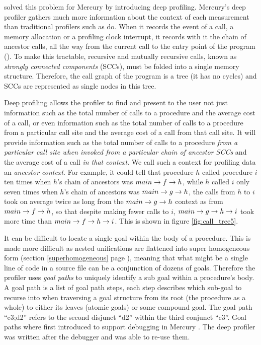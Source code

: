 \citep{conway:2001:mercury-deep}
solved this problem for Mercury by introducing deep profiling.
Mercury's deep profiler gathers much more information about the context of
each measurement than traditional profilers such as  \citep{gprof} do.
When it records the event of a call,
a memory allocation or a profiling clock interrupt,
it records with it the chain of ancestor calls,
all the way from the current call to the entry point of the program
().
To make this tractable,
recursive and mutually recursive calls,
known as \emph{strongly connected components} (SCCs),
must be folded into a single memory structure.
Therefore, the call graph of the program is a tree (it has no cycles)
and SCCs are represented as single nodes in this tree.

Deep profiling allows the profiler to find and present to the user
not just information such as the total number of calls to a procedure
and the average cost of a call,
or even information such as the total number of calls to a procedure
from a particular call site and the average cost of a call from that call
site.
It will provide information such as the total number of calls to a procedure
\emph{from a particular call site
when invoked from a particular chain of ancestor SCCs}
and the average cost of a call \emph{in that context}.
We call such a context for profiling data an \emph{ancestor context}.
For example, it could tell that
procedure $h$ called procedure $i$ ten times
when $h$'s chain of ancestors was $main \rightarrow f \rightarrow h$,
while $h$ called $i$ only seven times
when $h$'s chain of ancestors was $main \rightarrow g \rightarrow h$,
the calls from $h$ to $i$ took on average twice as long
from the $main \rightarrow g \rightarrow h$ context as from $main \rightarrow f \rightarrow h$,
so that despite making fewer calls to $i$,
$main \rightarrow g \rightarrow h \rightarrow i$ took more time than $main \rightarrow f \rightarrow h \rightarrow i$.
This is shown in figure \ref{fig:call_tree5}.


It can be difficult to locate a single goal within the body of a procedure.
This is made more difficult as nested unifications are flattened into super
homogeneous form
(section \ref{superhomogeneous} page \pageref{superhomogeneous}),
meaning that what might be a single line of code in a source file
can be a conjunction of dozens of goals.
Therefore the profiler uses \emph{goal paths} to uniquely identify a sub
goal within a procedure's body.
A goal path is a list of goal path steps, each step describes which
sub-goal to recurse into when traversing a goal structure from its
root (the procedure as a whole)
to either its leaves (atomic goals) or some compound goal.
The goal path ``c3;d2'' refers to the second disjunct ``d2'' within the
third conjunct ``c3''.
Goal paths where first introduced to support debugging in Mercury \citep{mdb}.
The deep profiler was written after the debugger and was able to re-use them.

